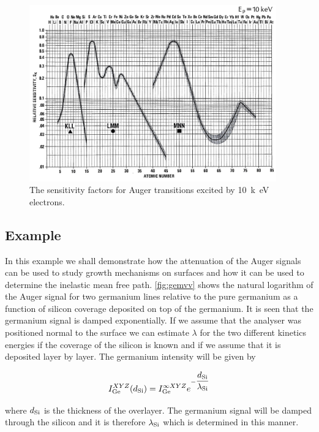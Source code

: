 \begin{figure}[h!]
	\begin{center}
	\includegraphics[width=0.95\textwidth]{figures/auger_sensitivity_10kev.png}
	\caption{The sensitivity factors for Auger transitions excited by \SI{10}{k\electronvolt} electrons.}
	\label{fig:aessf10kev}
	\end{center}
\end{figure} 

\subsection{Example}
In this example we shall demonstrate how the attenuation of the Auger signals can be used to study growth mechanisms on surfaces and how it can be used to determine the inelastic mean free path. \autoref{fig:gemvv} shows the natural logarithm of the Auger signal for two germanium lines relative to the pure germanium as a function of silicon coverage deposited on top of the germanium. It is seen that the germanium signal is damped exponentially. If we assume that the analyser was positioned normal to the surface we can estimate $\lambda$ for the two different kinetics energies if the coverage of the silicon is known and if we assume that it is deposited layer by layer. The germanium intensity will be given by

\begin{equation}\label{eq:gesignal}
I^{XYZ}_{\ce{Ge}}(d_{\ce{Si}})=I^{\infty XYZ}_{\ce{Ge}}e^{-\dfrac{d_{\ce{Si}}}{\lambda_{\ce{Si}}}}
\end{equation}

\noindent where $d_{\ce{Si}}$ is the thickness of the overlayer. The germanium signal will be damped through the silicon and it is therefore $\lambda_{\ce{Si}}$ which is determined in this manner.

